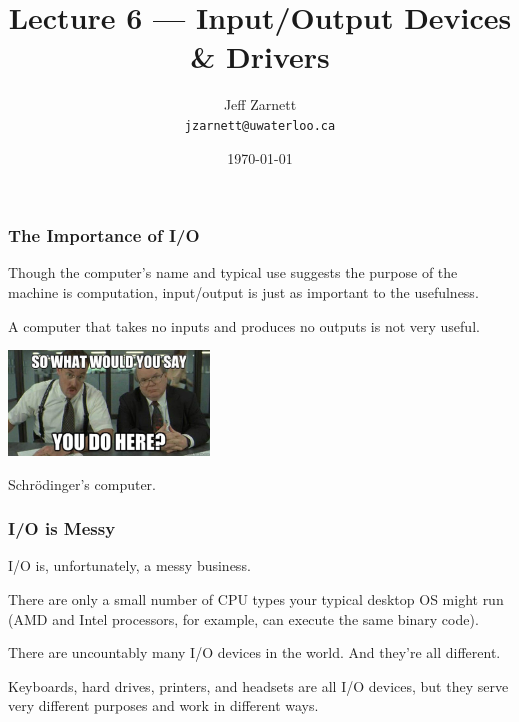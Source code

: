 

\title{Lecture 6 --- Input/Output Devices \& Drivers }

\author{Jeff Zarnett \\ \small \texttt{jzarnett@uwaterloo.ca}}
\date{\today}




\begin{frame}
  \titlepage

 \end{frame}




\begin{frame}
\frametitle{The Importance of I/O}

Though the computer's name and typical use suggests the purpose of the machine is computation, input/output is just as important to the usefulness. 

A computer that takes no inputs and produces no outputs is not very useful.

\begin{center}
	\includegraphics[width=0.4\textwidth]{images/whatyoudohere.jpg}
\end{center}

Schr\"odinger's computer.


\end{frame}

\begin{frame}
\frametitle{I/O is Messy}

I/O is, unfortunately, a messy business. 

There are only a small number of CPU types your typical desktop OS might run (AMD and Intel processors, for example, can execute the same binary code).

There are uncountably many I/O devices in the world. And they're all different. 

Keyboards, hard drives, printers, and headsets are all I/O devices, but they serve very different purposes and work in different ways.


\end{frame}

